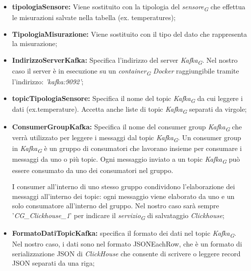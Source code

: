 \begin{itemize}
	\item \textbf{tipologiaSensore:} Viene sostituito con la tipologia del \textit{sensore}\textsubscript{\textit{G}} che effettua le misurazioni salvate nella tabella (ex. temperatures);
	\item \textbf{TipologiaMisurazione:} Viene sostituito con il tipo del dato che rappresenta la misurazione;
	\item \textbf{IndirizzoServerKafka:} Specifica l'indirizzo del server \textit{Kafka}\textsubscript{\textit{G}}. Nel nostro caso il server è in esecuzione su un \textit{container}\textsubscript{\textit{G}} \textit{Docker} raggiungibile tramite l'indirizzo: \textit{'kafka:9092'};
	\item \textbf{topicTipologiaSensore:} Specifica il nome del topic \textit{Kafka}\textsubscript{\textit{G}} da cui leggere i dati (ex.temperature). Accetta anche liste di topic \textit{Kafka}\textsubscript{\textit{G}} separati da virgole;
	\item \textbf{ConsumerGroupKafka:} Specifica il nome del consumer group \textit{Kafka}\textsubscript{\textit{G}} che verrà utilizzato per leggere i messaggi dal topic \textit{Kafka}\textsubscript{\textit{G}}.
	Un consumer group in \textit{Kafka}\textsubscript{\textit{G}} è un gruppo di consumatori che lavorano insieme per consumare i messaggi da uno o più topic. Ogni messaggio inviato a un topic \textit{Kafka}\textsubscript{\textit{G}} può essere consumato da uno dei consumatori nel gruppo.
	
	I consumer all'interno di uno stesso gruppo condividono l'elaborazione dei messaggi all'interno dei topic: ogni messaggio viene elaborato da uno e un solo consumatore all'interno del gruppo. Nel nostro caso sarà sempre '\textit{CG\_Clickhouse\_1}' per indicare il \textit{servizio}\textsubscript{\textit{G}} di salvataggio \textit{Clickhouse};
	\item \textbf{FormatoDatiTopicKafka:} specifica il formato dei dati nel topic \textit{Kafka}\textsubscript{\textit{G}}. Nel nostro caso, i dati sono nel formato JSONEachRow, che è un formato di serializzazione JSON di \textit{ClickHouse} che consente di scrivere o leggere record JSON separati da una riga;



\end{itemize}
